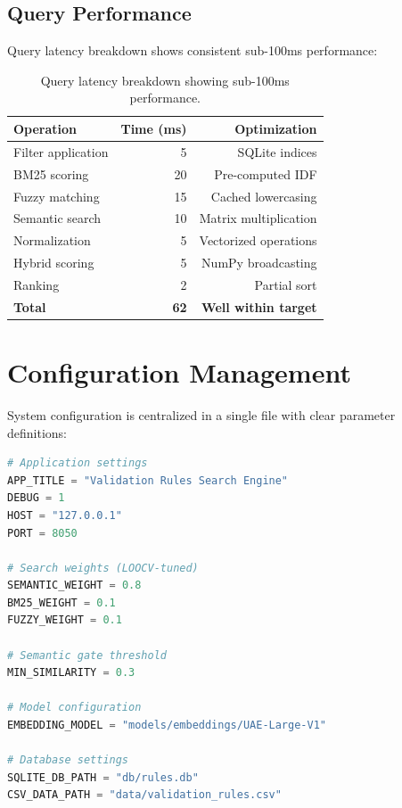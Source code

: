 \subsection{Query Performance}

Query latency breakdown shows consistent sub-100ms performance:

\begin{table}[!htbp]
\centering
\begin{tabular}{lrr}
\toprule
\textbf{Operation} & \textbf{Time (ms)} & \textbf{Optimization} \\
\midrule
Filter application & 5 & SQLite indices \\
BM25 scoring & 20 & Pre-computed IDF \\
Fuzzy matching & 15 & Cached lowercasing \\
Semantic search & 10 & Matrix multiplication \\
Normalization & 5 & Vectorized operations \\
Hybrid scoring & 5 & NumPy broadcasting \\
Ranking & 2 & Partial sort \\
\midrule
\textbf{Total} & \textbf{62} & \textbf{Well within target} \\
\bottomrule
\end{tabular}
\caption{Query latency breakdown showing sub-100ms performance.}
\label{tab:query-performance}
\end{table}

\section{Configuration Management}

System configuration is centralized in a single file with clear parameter definitions:

\begin{lstlisting}[language=Python, caption={Configuration settings (config.py)}, label={lst:config}]
# Application settings
APP_TITLE = "Validation Rules Search Engine"
DEBUG = 1
HOST = "127.0.0.1"
PORT = 8050

# Search weights (LOOCV-tuned)
SEMANTIC_WEIGHT = 0.8
BM25_WEIGHT = 0.1
FUZZY_WEIGHT = 0.1

# Semantic gate threshold
MIN_SIMILARITY = 0.3

# Model configuration
EMBEDDING_MODEL = "models/embeddings/UAE-Large-V1"

# Database settings
SQLITE_DB_PATH = "db/rules.db"
CSV_DATA_PATH = "data/validation_rules.csv"
\end{lstlisting}

